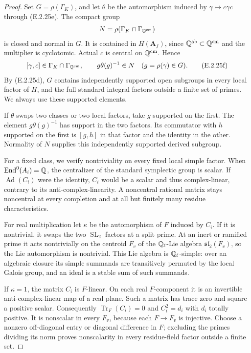 \begin{proof}
Set \(G=\rho(\Gamma_K)\), and let \(\theta\) be
the automorphism induced by \(\gamma\mapsto c\gamma c\)
through (E.2.25e). The compact group
\[
 N=\rho(\Gamma_K\cap\Gamma_{\mathbb Q^{\mathrm{cm}}})
\]
is closed and normal in \(G\). It is contained in
\(H(\mathbf A_f)\), since
\(\mathbb Q^{\mathrm{ab}}\subset\mathbb Q^{\mathrm{cm}}\) and
the multiplier is cyclotomic. Actual \(c\) is
central on \(\mathbb Q^{\mathrm{cm}}\). Hence
\[
 [\gamma,c]\in\Gamma_K\cap\Gamma_{\mathbb Q^{\mathrm{cm}}},
 \qquad g\theta(g)^{-1}\in N
                \quad(g=\rho(\gamma)\in G).
 \tag{E.2.25f}
\]
By (E.2.25d), \(G\) contains independently supported
open subgroups in every local factor of \(H\), and
the full standard integral factors outside a finite
set of primes. We always use these supported elements.

If \(\theta\) swaps two classes or two local factors,
take \(g\) supported on the first. The element
\(g\theta(g)^{-1}\) has support in the two factors.
Its commutator with \(h\) supported on the first
is \([g,h]\) in that factor and the identity in
the other. Normality of \(N\) supplies this
independently supported derived subgroup.

For a fixed class, we verify nontriviality on every
fixed local simple factor. When \(\operatorname{End}^0(A_i)=\mathbb Q\),
the centralizer of the standard symplectic group
is scalar. If \(\operatorname{Ad}(C_i)\) were the
identity, \(C_i\) would be a scalar and thus
complex-linear, contrary to its anti-complex-linearity.
A noncentral rational matrix stays noncentral at
every completion and at all but finitely many
residue characteristics.

For real multiplication let \(\kappa\) be the
automorphism of \(F\) induced by \(C_i\). If it is
nontrivial, it swaps the two \(\operatorname{SL}_2\)
factors at a split prime. At an inert or ramified
prime it acts nontrivially on the centroid \(F_v\)
of the \(\mathbb Q_\ell\)-Lie algebra
\(\mathfrak{sl}_2(F_v)\), so the Lie automorphism
is nontrivial. This Lie algebra is \(\mathbb Q_\ell\)-simple:
over an algebraic closure its simple summands are
transitively permuted by the local Galois group,
and an ideal is a stable sum of such summands.

If \(\kappa=1\), the matrix \(C_i\) is \(F\)-linear.
On each real \(F\)-component it is an invertible
anti-complex-linear map of a real plane. Such a
matrix has trace zero and square a positive scalar.
Consequently
\(\operatorname{Tr}_F(C_i)=0\) and \(C_i^2=d_i\)
with \(d_i\) totally positive. It is nonscalar
in every \(F_v\), because each \(F\to F_v\) is
injective. Choose a nonzero off-diagonal entry or
diagonal difference in \(F\); excluding the primes
dividing its norm proves nonscalarity in every
residue-field factor outside a finite set.


\end{proof}
